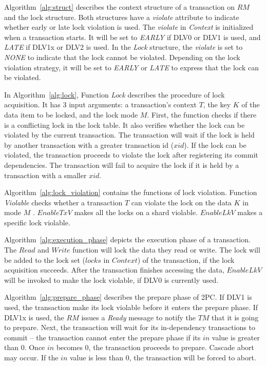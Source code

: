 \documentclass[conference]{IEEEtran}
\begin{document}
Algorithm~\ref{alg:struct} describes the context structure of a transaction on ${RM}$ and the lock structure.
Both structures have a \emph{violate} attribute to indicate whether early or late lock violation is used.
The \emph{violate} in \emph{Context} is initialized when a transaction starts.
It will be set to \emph{EARLY} if DLV0 or DLV1 is used, and \emph{LATE} if DLV1x or DLV2 is used.
In the \emph{Lock} structure, the \emph{violate} is set to \emph{NONE} to indicate that the lock cannot be violated.
Depending on the lock violation strategy, it will be set to \emph{EARLY} or \emph{LATE} to express that the lock can be violated.

In Algorithm~\ref{alg:lock},  Function \emph{Lock} describes the procedure of lock acquisition.
It has 3 input arguments: a transaction's context ${T}$, the key ${K}$ of the data item to be locked, and the lock mode ${M}$.
First, the function checks if there is a conflicting lock in the lock table.
It also verifies whether the lock can be violated by the current transaction.
The transaction will wait if the lock is held by another transaction with a greater transaction id ($xid$).
If the lock can be violated, the transaction proceeds to violate the lock after registering its commit dependencies. 
The transaction will fail to acquire the lock if it is held by a transaction with a smaller $xid$.

Algorithm~\ref{alg:lock_violation} contains the functions of lock violation.
Function \emph{Violable} checks whether a transaction ${T}$ can violate the lock on the data ${K}$ in mode ${M}$ .
$EnableTxV$ makes all the locks on a shard violable.
$EnableLkV$ makes a specific lock violable.

Algorithm~\ref{alg:execution_phase} depicts the execution phase of a transaction.
The $Read$ and $Write$ function will lock the data they read or write.
The lock will be added to the lock set (${locks}$ in ${Context}$) of the transaction,
if the lock acquisition succeeds.
After the transaction finishes accessing the data,
$EnableLkV$ will be invoked to make the lock violable, if DLV0 is currently used. 

Algorithm~\ref{alg:prepare_phase} describes the prepare phase of 2PC.
If DLV1 is used, the transaction make its lock violable before it enters the prepare phase.
If DLV1x is used, the ${RM}$ issues  a \emph{Ready} message to notify the ${TM}$ that it is going to prepare.
Next, the transaction will wait for its in-dependency transactions to commit --
the transaction cannot enter the prepare phase if its ${in}$ value is greater than 0.
Once ${in}$ becomes 0, the transaction proceeds to prepare.
Cascade abort may occur.
If the ${in}$ value is less than 0, the transaction will be forced to abort. 
\end{document}
